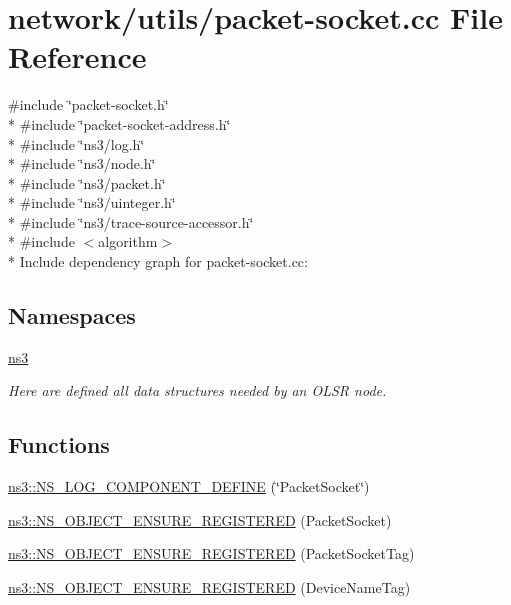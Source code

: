 \hypertarget{packet-socket_8cc}{}\section{network/utils/packet-\/socket.cc File Reference}
\label{packet-socket_8cc}
{\ttfamily \#include \char`\"{}packet-\/socket.\+h\char`\"{}}\\*
{\ttfamily \#include \char`\"{}packet-\/socket-\/address.\+h\char`\"{}}\\*
{\ttfamily \#include \char`\"{}ns3/log.\+h\char`\"{}}\\*
{\ttfamily \#include \char`\"{}ns3/node.\+h\char`\"{}}\\*
{\ttfamily \#include \char`\"{}ns3/packet.\+h\char`\"{}}\\*
{\ttfamily \#include \char`\"{}ns3/uinteger.\+h\char`\"{}}\\*
{\ttfamily \#include \char`\"{}ns3/trace-\/source-\/accessor.\+h\char`\"{}}\\*
{\ttfamily \#include $<$algorithm$>$}\\*
Include dependency graph for packet-\/socket.cc\+:
\subsection*{Namespaces}
\begin{DoxyCompactItemize}
\item 
 \hyperlink{namespacens3}{ns3}
\begin{DoxyCompactList}\small\item\em Here are defined all data structures needed by an O\+L\+SR node. \end{DoxyCompactList}\end{DoxyCompactItemize}
\subsection*{Functions}
\begin{DoxyCompactItemize}
\item 
\hyperlink{namespacens3_a17dab89f6e05a03444c383368f04a594}{ns3\+::\+N\+S\+\_\+\+L\+O\+G\+\_\+\+C\+O\+M\+P\+O\+N\+E\+N\+T\+\_\+\+D\+E\+F\+I\+NE} (\char`\"{}Packet\+Socket\char`\"{})
\item 
\hyperlink{namespacens3_a6ab0749992512fb50a072f6fdedfa633}{ns3\+::\+N\+S\+\_\+\+O\+B\+J\+E\+C\+T\+\_\+\+E\+N\+S\+U\+R\+E\+\_\+\+R\+E\+G\+I\+S\+T\+E\+R\+ED} (Packet\+Socket)
\item 
\hyperlink{namespacens3_a897e42121e5a01119ec4f1bdb7ecef66}{ns3\+::\+N\+S\+\_\+\+O\+B\+J\+E\+C\+T\+\_\+\+E\+N\+S\+U\+R\+E\+\_\+\+R\+E\+G\+I\+S\+T\+E\+R\+ED} (Packet\+Socket\+Tag)
\item 
\hyperlink{namespacens3_a6a24fb4d771bc799fdef1e99c53b91ac}{ns3\+::\+N\+S\+\_\+\+O\+B\+J\+E\+C\+T\+\_\+\+E\+N\+S\+U\+R\+E\+\_\+\+R\+E\+G\+I\+S\+T\+E\+R\+ED} (Device\+Name\+Tag)
\end{DoxyCompactItemize}
